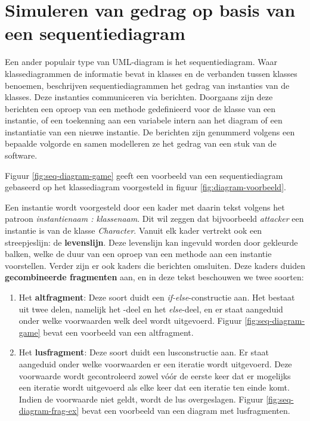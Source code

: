 \chapter{Simuleren van gedrag op basis van een sequentiediagram}\label{sec:gedrag}
Een ander populair type van UML-diagram is het sequentiediagram. Waar klassediagrammen de informatie bevat in klasses en de verbanden tussen klasses benoemen, beschrijven sequentiediagrammen het gedrag van instanties van de klasses. Deze instanties communiceren via berichten. Doorgaans zijn deze berichten een oproep van een methode gedefinieerd voor de klasse van een instantie, of een toekenning aan een variabele intern aan het diagram of een instantiatie van een nieuwe instantie. De berichten zijn genummerd volgens een bepaalde volgorde en samen modelleren ze het gedrag van een stuk van de software.

\parbreak

Figuur \ref{fig:seq-diagram-game} geeft een voorbeeld van een sequentiediagram gebaseerd op het klassediagram voorgesteld in figuur \ref{fig:diagram-voorbeeld}.

Een instantie wordt voorgesteld door een kader met daarin tekst volgens het patroon \textit{instantienaam : klassenaam}. Dit wil zeggen dat bijvoorbeeld \textit{attacker} een instantie is van de klasse \textit{Character}. Vanuit elk kader vertrekt ook een streepjeslijn: de \textbf{levenslijn}. Deze levenslijn kan ingevuld worden door gekleurde balken, welke de duur van een oproep van een methode aan een instantie voorstellen.
Verder zijn er ook kaders die berichten omsluiten. Deze kaders duiden \textbf{gecombineerde fragmenten} aan, en in deze tekst beschouwen we twee soorten:

\begin{enumerate}
	\item Het \textbf{altfragment}: Deze soort duidt een \textit{if-else}-constructie aan. Het bestaat uit twee delen, namelijk het -deel en het \textit{else}-deel, en er staat aangeduid onder welke voorwaarden welk deel wordt uitgevoerd. Figuur \ref{fig:seq-diagram-game} bevat een voorbeeld van een altfragment.
	\item Het \textbf{lusfragment}: Deze soort duidt een lusconstructie aan. Er staat aangeduid onder welke voorwaarden er een iteratie wordt uitgevoerd. Deze voorwaarde wordt gecontroleerd zowel v\'o\'or de eerste keer dat er mogelijks een iteratie wordt uitgevoerd als elke keer dat een iteratie ten einde komt. Indien de voorwaarde niet geldt, wordt de lus overgeslagen. Figuur \ref{fig:seq-diagram-frag-ex} bevat een voorbeeld van een diagram met lusfragmenten.
\end{enumerate}

